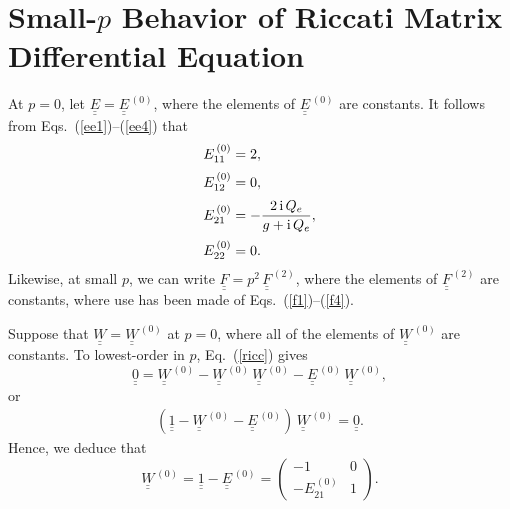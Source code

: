 \documentclass[12pt,prb,aps,notitlepage]{revtex4-1}
\begin{document}
\section{Small-$p$ Behavior of Riccati Matrix Differential Equation}
At $p=0$, let $\underline{\underline{E}} = \underline{\underline{E}}^{\,(0)}$,
where the elements of  $\underline{\underline{E}}^{\,(0)}$ are constants.
It follows from Eqs.~(\ref{ee1})--(\ref{ee4})  that
\begin{align}
E_{11}^{\,(0)} &= 2,\\[0.5ex]
E_{12}^{\,(0)}&=0,\\[0.5ex]
E_{21}^{\,(0)} &= - \frac{2\,{\rm i}\,Q_e}{g+{\rm i}\,Q_e},\label{e210}\\[0.5ex]
E_{22}^{\,(0)}&= 0.
\end{align}
Likewise, at small $p$, we can write $\underline{\underline{F}} =p^2\, \underline{\underline{F}}^{\,(2)}$,
where the elements of  $\underline{\underline{F}}^{\,(2)}$ are constants, where use has been made of Eqs.~(\ref{f1})--(\ref{f4}). 

Suppose that  $\underline{\underline{W}}= \underline{\underline{W}}^{\,(0)}$ at $p=0$, 
where all of the elements of $\underline{\underline{W}}^{\,(0)}$ are constants.
To lowest-order in $p$, Eq.~(\ref{ricc}) gives
\begin{equation}
\underline{\underline{0}}= \underline{\underline{W}}^{\,(0)}-\underline{\underline{W}}^{\,(0)}\,\underline{\underline{W}}^{\,(0)}- 
\underline{\underline{E}}^{\,(0)}\,\underline{\underline{W}}^{\,(0)},
\end{equation}
or
\begin{align}
( \underline{\underline{1}}-\underline{\underline{W}}^{\,(0)}-\underline{\underline{E}}^{\,(0)})\,\underline{\underline{W}}^{\,(0)} = \underline{\underline{0}}.
\end{align}
Hence, we deduce that 
\begin{equation}\label{w0def}
\underline{\underline{W}}^{\,(0)} =  \underline{\underline{1}}-\underline{\underline{E}}^{\,(0)} =  \left(\begin{array}{cc} -1&0\\-E_{21}^{\,(0)}&1\end{array}\right).
\end{equation}
\end{document}
